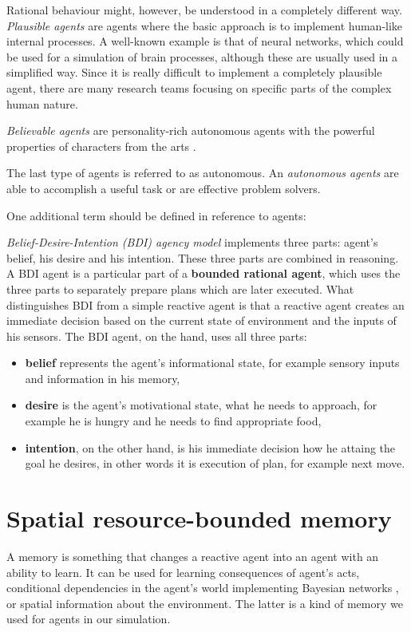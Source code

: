 Rational behaviour might, however, be understood in a completely different way. \emph{Plausible agents} are agents where the basic approach is to implement human-like internal processes. A well-known example is that of neural networks, which could be used for a simulation of brain processes, although these are usually used in a simplified way. Since it is really difficult to implement a completely plausible agent, there are many research teams focusing on specific parts of the complex human nature.

\emph{Believable agents} are personality-rich autonomous agents with the powerful properties of characters from the arts \cite{Loyall:believableagents}. 

The last type of agents is referred to as autonomous. An \emph{autonomous agents} are able to accomplish a useful task or are effective problem solvers.

One additional term should be defined in reference to agents:

\textit{Belief-Desire-Intention (BDI) agency model} implements three parts: agent's belief, his desire and his intention. These three parts are combined in reasoning. A BDI agent is a particular part of a \textbf{bounded rational agent}, which uses the three parts to separately prepare plans which are later executed. What distinguishes BDI from a simple reactive agent is that a reactive agent creates an immediate decision based on the current state of environment and the inputs of his sensors. The BDI agent, on the hand, uses all three parts:

\begin{itemize}
\item {\bf belief} represents the agent's informational state, for example sensory inputs and information in his memory,
\item {\bf desire} is the agent's motivational state, what he needs to approach, for example he is hungry and he needs to find appropriate food,
\item {\bf intention}, on the other hand, is his immediate decision how he attaing the goal he desires, in other words it is execution of plan, for example next move.
\end{itemize}

\section{Spatial resource-bounded memory}

A memory is something that changes a reactive agent into an agent with an ability to learn. It can be used for learning consequences of agent's acts, conditional dependencies in the agent's world implementing Bayesian networks \cite{Pearl:bayesian}, or spatial information about the environment. The latter is a kind of memory we used for agents in our simulation. 

